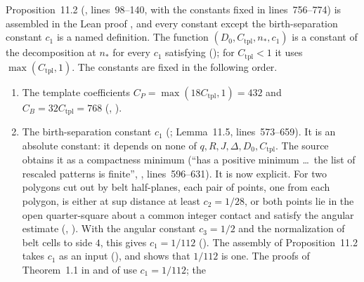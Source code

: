 \documentclass[11pt]{article}
\newcommand{\src}[1]{\path{#1}}
\newcommand{\Ctpl}{C_{\mathrm{tpl}}}
\begin{document}
Proposition~11.2 (\src{10-geometry.tex}, lines~98--140, with the constants
fixed in lines~756--774) is assembled in the Lean proof
, and
every constant except the birth-separation constant $c_1$ is a named
definition. The function
$(D_0,\Ctpl,n_*,c_1)$
is a constant of the decomposition at $n_*$ for every $c_1$ satisfying
();
for $\Ctpl<1$ it uses $\max(\Ctpl,1)$. The constants are fixed in the
following order.
\begin{enumerate}
    \item The template coefficients $C_P=\max(18\Ctpl,1)=432$ and
          $C_B=32\Ctpl=768$
          (,
          ).
    \item The birth-separation constant $c_1$
          (;
          Lemma~11.5, lines~573--659). It is an absolute constant: it depends on
          none of $q,R,J,\Delta,D_0,\Ctpl$. The source obtains it as a compactness
          minimum (``has a positive minimum \dots\ the list of rescaled
          patterns is finite'', \src{10-geometry.tex}, lines~596--631). It is
          now explicit. For two polygons cut out by belt half-planes, each
          pair of points, one from each polygon, is either at sup distance at
          least $c_2=1/28$, or both points lie in the open quarter-square
          about a common integer contact and satisfy the angular estimate
          (,
          ).
          With the angular constant $c_3=1/2$ and the normalization of belt
          cells to side $4$, this gives $c_1=1/112$
          ().
          The assembly of Proposition~11.2 takes $c_1$ as an input
          (), and
          shows that $1/112$ is one. The proofs of Theorem~1.1 in
           and of
           use $c_1=1/112$; the

\end{enumerate}
\end{document}
